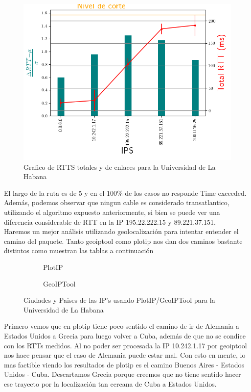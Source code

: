 \begin{figure}[ht]
	\begin{center}
		\includegraphics[width=0.8\columnwidth]{imagenes/rtts_habana.png}
		\caption{Grafico de RTTS totales y de enlaces para la Universidad de La Habana}
	\end{center}
\end{figure}

El largo de la ruta es de 5 y en el 100\% de los casos no responde Time
exceeded. Adem\'as, podemos observar que ningun cable es considerado
transatlantico, utilizando el algoritmo expuesto anteriormente, si bien se
puede ver una diferencia considerable de RTT en la IP 195.22.222.15 y
89.221.37.151.  \\

Haremos un mejor an\'alisis utilizando geolocalizaci\'on para intentar entender
el camino del paquete. Tanto geoiptool como plotip nos dan dos caminos bastante
distintos como muestran las tablas a continuaci\'on
 
\begin{figure}[ht]
	\begin{subfigure}[b]{0.5\textwidth}
		\centering
		
		\caption{PlotIP}
	\end{subfigure}
	\begin{subfigure}[b]{0.5\textwidth}
		\centering
		
		\caption{GeoIPTool}
	\end{subfigure}
	\caption{Ciudades y Paises de las IP's usando PlotIP/GeoIPTool para la Universidad de La Habana}
\end{figure}


Primero vemos que en plotip tiene poco sentido el camino de ir de Alemania a
Estados Unidos a Grecia para luego volver a Cuba, adem\'as de que no se condice
con los RTTs medidos. Al no poder ser procesada la IP 10.242.1.17 por geoiptool
nos hace pensar que el caso de Alemania puede estar mal. Con esto en mente, lo
mas factible viendo los resultados de plotip es el camino Buenos Aires -
Estados Unidos - Cuba. Descartamos Grecia porque creemos que no tiene sentido
hacer ese trayecto por la localizaci\'on tan cercana de Cuba a Estados
Unidos.\\

